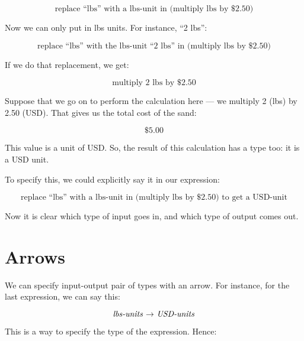 \documentclass{book}
\numberwithin{equation}{chapter}
\begin{document}
\begin{equation}
\text{replace ``lbs'' with a lbs-unit in (multiply lbs by \$2.50)}
\end{equation}

\noindent
Now we can only put in lbs units. For instance, ``2 lbs'':

\begin{equation}
\text{replace ``lbs'' with the lbs-unit ``2 lbs'' in (multiply lbs by \$2.50)}
\end{equation}

\noindent
If we do that replacement, we get:

\begin{equation}
\text{multiply 2 lbs by \$2.50}
\end{equation}

\noindent
Suppose that we go on to perform the calculation here --- we multiply 2 (lbs) by 2.50 (USD). That gives us the total cost of the sand:

\begin{equation}
\$5.00
\end{equation}

\noindent
This value is a unit of USD. So, the result of this calculation has a type too: it is a USD unit.

To specify this, we could explicitly say it in our expression:

\begin{equation}
\text{replace ``lbs'' with a lbs-unit in (multiply lbs by \$2.50) to get a USD-unit}
\end{equation}

\noindent
Now it is clear which type of input goes in, and which type of output comes out.


\section{Arrows}

We can specify input-output pair of types with an arrow. For instance, for the last expression, we can say this:

\begin{equation}
\text{\textit{lbs-units} $\rightarrow$ \textit{USD-units}}
\end{equation}

\noindent
This is a way to specify the type of the expression. Hence: 
\end{document}
